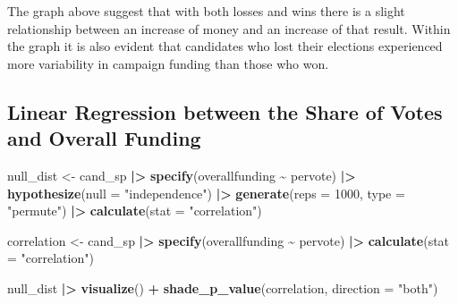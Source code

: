 \documentclass[
]{article}
\newenvironment{Shaded}{\begin{snugshade}}{\end{snugshade}}
\newcommand{\AttributeTok}[1]{\textcolor[rgb]{0.13,0.29,0.53}{#1}}
\newcommand{\DecValTok}[1]{\textcolor[rgb]{0.00,0.00,0.81}{#1}}
\newcommand{\FunctionTok}[1]{\textcolor[rgb]{0.13,0.29,0.53}{\textbf{#1}}}
\newcommand{\NormalTok}[1]{#1}
\newcommand{\OtherTok}[1]{\textcolor[rgb]{0.56,0.35,0.01}{#1}}
\newcommand{\SpecialCharTok}[1]{\textcolor[rgb]{0.81,0.36,0.00}{\textbf{#1}}}
\newcommand{\StringTok}[1]{\textcolor[rgb]{0.31,0.60,0.02}{#1}}
\begin{document}
The graph above suggest that with both losses and wins there is a slight
relationship between an increase of money and an increase of that
result. Within the graph it is also evident that candidates who lost
their elections experienced more variability in campaign funding than
those who won.

\hypertarget{linear-regression-between-the-share-of-votes-and-overall-funding}{%
\subsection{\texorpdfstring{\textbf{Linear Regression between the Share
of Votes and Overall
Funding}}{Linear Regression between the Share of Votes and Overall Funding}}\label{linear-regression-between-the-share-of-votes-and-overall-funding}}

\begin{Shaded}
\begin{Highlighting}[]
\NormalTok{null\_dist }\OtherTok{\textless{}{-}}\NormalTok{ cand\_sp }\SpecialCharTok{|\textgreater{}}
  \FunctionTok{specify}\NormalTok{(overallfunding }\SpecialCharTok{\textasciitilde{}}\NormalTok{ pervote) }\SpecialCharTok{|\textgreater{}}
  \FunctionTok{hypothesize}\NormalTok{(}\AttributeTok{null =} \StringTok{"independence"}\NormalTok{) }\SpecialCharTok{|\textgreater{}}
  \FunctionTok{generate}\NormalTok{(}\AttributeTok{reps =} \DecValTok{1000}\NormalTok{, }\AttributeTok{type =} \StringTok{"permute"}\NormalTok{) }\SpecialCharTok{|\textgreater{}}
  \FunctionTok{calculate}\NormalTok{(}\AttributeTok{stat =} \StringTok{"correlation"}\NormalTok{)}

\NormalTok{correlation }\OtherTok{\textless{}{-}}\NormalTok{ cand\_sp }\SpecialCharTok{|\textgreater{}}
  \FunctionTok{specify}\NormalTok{(overallfunding }\SpecialCharTok{\textasciitilde{}}\NormalTok{ pervote) }\SpecialCharTok{|\textgreater{}}
  \FunctionTok{calculate}\NormalTok{(}\AttributeTok{stat =} \StringTok{"correlation"}\NormalTok{)}

\NormalTok{null\_dist }\SpecialCharTok{|\textgreater{}}
  \FunctionTok{visualize}\NormalTok{() }\SpecialCharTok{+}
  \FunctionTok{shade\_p\_value}\NormalTok{(correlation, }\AttributeTok{direction =} \StringTok{"both"}\NormalTok{)}
\end{Highlighting}
\end{Shaded}
\end{document}
